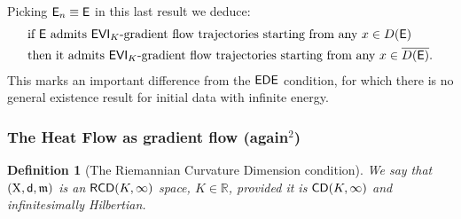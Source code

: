\documentclass[11pt]{article}
\numberwithin{equation}{section}
\newtheorem{definition}[theorem]{Definition}
\newcommand{\R}{\mathbb{R}}
\newcommand{\X}{{\rm X}}
\newcommand{\sfd}{{\sf d}}
\newcommand{\mm}{{\mathfrak m}}
\newcommand{\CD}{{\sf CD}}
\newcommand{\RCD}{{\sf RCD}}
\newcommand{\limi}{\varliminf}
\newcommand{\E}{{\sf E}} %
\newcommand{\EDE}{{\sf EDE}}
\newcommand{\EVI}{{\sf EVI}}
\DeclareMathOperator*{\glimi}{{\Gamma-\limi}}
\begin{document}
Picking $\E_n\equiv \E$ in this last result we deduce:
\begin{equation}
\label{eq:exevi}
\begin{split}
&\text{if $\E$ admits $\EVI_K$-gradient flow trajectories starting from any $x\in D(\E)$}\\
&\text{then it admits $\EVI_K$-gradient flow trajectories starting from any $x\in \overline{D(\E)}$.}
\end{split}
\end{equation}
This marks an important difference from the $\EDE$ condition, for which there is no general existence result for initial data with infinite energy.%




\subsubsection{The Heat Flow as gradient flow (again$^2$)}
\begin{definition}[The Riemannian Curvature Dimension condition]\label{def:rcd} We say that $(\X,\sfd,\mm)$ is an $\RCD(K,\infty)$ space, $K\in\R$, provided it is $\CD(K,\infty)$ and infinitesimally Hilbertian.
\end{definition}
\end{document}
